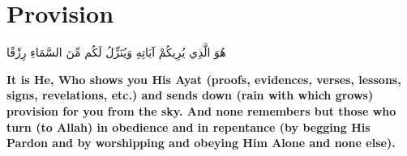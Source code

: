 \chapter{Provision}
\begin{center}
    {\Huge    
        \begin{Arabic}
            هُوَ الَّذِي يُرِيكُمْ آيَاتِهِ وَيُنَزِّلُ لَكُم مِّنَ السَّمَاءِ رِزْقًا
        \end{Arabic}
    }
\end{center}
\vspace*{\fill}
\vspace{3cm}
\begin{center}
    \large \textbf{It is He, Who shows you His Ayat (proofs, evidences, verses, lessons, signs, revelations, etc.) and sends down (rain with which grows) provision for you from the sky. And none remembers but those who turn (to Allah) in obedience and in repentance (by begging His Pardon and by worshipping and obeying Him Alone and none else).}
\end{center}
